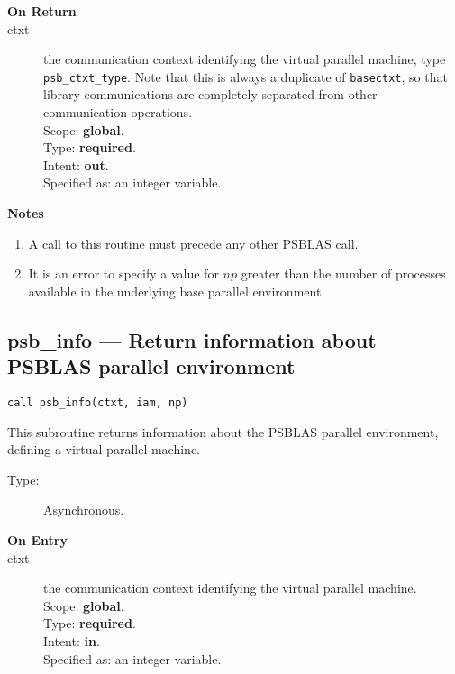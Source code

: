\begin{description}
\item[\bf On Return]
\item[ctxt] the communication context identifying the virtual
  parallel machine, type \verb|psb_ctxt_type|. Note that this is always a duplicate of
  \verb|basectxt|, so that library communications are completely
  separated from other communication operations.\\
Scope: {\bf global}.\\
Type: {\bf required}.\\
Intent: {\bf out}.\\
Specified as: an integer variable.
\end{description}


{\par\noindent\large\bfseries Notes}
\begin{enumerate}
\item A call to this routine must precede any other PSBLAS call. 
\item It is an error to specify a value for $np$ greater than the
  number of processes available in the underlying base parallel
  environment. 
\end{enumerate}


\clearpage\subsection{psb\_info --- Return information about  PSBLAS parallel
  environment}

\begin{verbatim}
call psb_info(ctxt, iam, np)
\end{verbatim}

This subroutine returns information about  the PSBLAS parallel environment, defining
a virtual parallel machine.
\begin{description}
\item[Type:] Asynchronous.
\item[\bf  On Entry ]
\item[ctxt] the communication context identifying the virtual
  parallel machine.\\
Scope: {\bf global}.\\
Type: {\bf required}.\\
Intent: {\bf in}.\\
Specified as: an integer variable.
\end{description}

